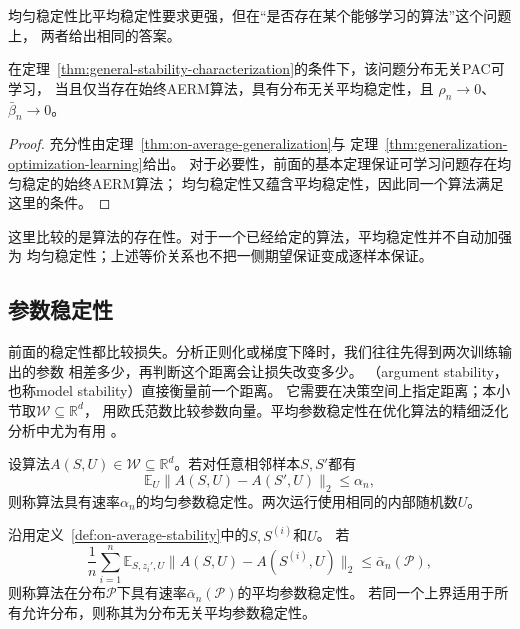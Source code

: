 均匀稳定性比平均稳定性要求更强，但在“是否存在某个能够学习的算法”这个问题上，
两者给出相同的答案。

\begin{theorem}[一般学习基本定理的平均稳定性形式]
\label{thm:average-stability-characterization}
在定理~\ref{thm:general-stability-characterization}的条件下，该问题分布无关PAC可学习，
当且仅当存在始终AERM算法，具有分布无关平均稳定性，且
$\rho_n\to0$、$\bar\beta_n\to0$。
\end{theorem}
\begin{proof}
充分性由定理~\ref{thm:on-average-generalization}与
定理~\ref{thm:generalization-optimization-learning}给出。
对于必要性，前面的基本定理保证可学习问题存在均匀稳定的始终AERM算法；
均匀稳定性又蕴含平均稳定性，因此同一个算法满足这里的条件。
\end{proof}

这里比较的是算法的存在性。对于一个已经给定的算法，平均稳定性并不自动加强为
均匀稳定性；上述等价关系也不把一侧期望保证变成逐样本保证。

\subsection{参数稳定性}
\label{sec:parameter-stability}

前面的稳定性都比较损失。分析正则化或梯度下降时，我们往往先得到两次训练输出的参数
相差多少，再判断这个距离会让损失改变多少。
（argument stability，也称model stability）直接衡量前一个距离。
它需要在决策空间上指定距离；本小节取$\mathcal W\subseteq\mathbb R^d$，
用欧氏范数比较参数向量。平均参数稳定性在优化算法的精细泛化分析中尤为有用
。

\begin{definition}[均匀参数稳定性]
\label{def:uniform-parameter-stability}
设算法$A(S,U)\in\mathcal W\subseteq\mathbb R^d$。若对任意相邻样本$S,S'$都有
\[
 \mathbb E_U\|A(S,U)-A(S',U)\|_2\leq\alpha_n,
\]
则称算法具有速率$\alpha_n$的均匀参数稳定性。两次运行使用相同的内部随机数$U$。
\end{definition}

\begin{definition}[平均参数稳定性]
\label{def:average-parameter-stability}
沿用定义~\ref{def:on-average-stability}中的$S,S^{(i)}$和$U$。
若
\begin{equation}
 \frac1n\sum_{i=1}^n\mathbb E_{S,z_i',U}
 \|A(S,U)-A(S^{(i)},U)\|_2\leq\bar\alpha_n(\mathcal P),
 \label{eq:average-parameter-stability}
\end{equation}
则称算法在分布$\mathcal P$下具有速率$\bar\alpha_n(\mathcal P)$的平均参数稳定性。
若同一个上界适用于所有允许分布，则称其为分布无关平均参数稳定性。
\end{definition}

